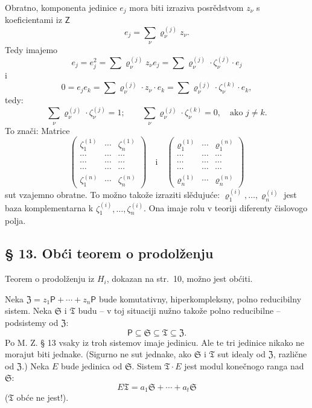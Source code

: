 \documentclass[11pt]{article}
\begin{document}
Obratno, komponenta jedinice \(e_j\) mora biti izraziva posrědstvom \(z_\nu\) s koeficientami iz \(\mathsf Z\)
\[
e_j=\sum_\nu \varrho_\nu^{(j)}z_\nu .
\]
Tedy imajemo
\[
e_j=e_j^2=\sum \varrho_\nu^{(j)}z_\nu e_j
=\sum \varrho_\nu^{(j)}\cdot\zeta_\nu^{(j)}\cdot e_j
\]
i
\[
0=e_je_k=\sum \varrho_\nu^{(j)}\cdot z_\nu\cdot e_k
=\sum \varrho_\nu^{(j)}\cdot\zeta_\nu^{(k)}\cdot e_k,
\]
tedy:
\[
\sum_\nu \varrho_\nu^{(j)}\cdot\zeta_\nu^{(j)}=1;
\qquad
\sum_\nu \varrho_\nu^{(j)}\cdot\zeta_\nu^{(k)}=0,\quad
\text{ako } j\ne k.
\]
To znači: Matrice
\[
\begin{pmatrix}
\zeta_1^{(1)} & \cdots & \zeta_n^{(1)}\\
\cdots & \cdots & \cdots\\
\cdots & \cdots & \cdots\\
\cdots & \cdots & \cdots\\
\zeta_1^{(n)} & \cdots & \zeta_n^{(n)}
\end{pmatrix}
\quad\text{i}\quad
\begin{pmatrix}
\varrho_1^{(1)} & \cdots & \varrho_1^{(n)}\\
\cdots & \cdots & \cdots\\
\cdots & \cdots & \cdots\\
\cdots & \cdots & \cdots\\
\varrho_n^{(1)} & \cdots & \varrho_n^{(n)}
\end{pmatrix}
\]
sut vzajemno obratne. To možno takože izraziti slědujuće: \(\varrho_1^{(i)},\ldots,\varrho_n^{(i)}\) jest baza komplementarna k \(\zeta_1^{(i)},\ldots,\zeta_n^{(i)}\). Ona imaje rolu v teoriji diferenty čislovogo polja.

\subsection*{§ 13. Obći teorem o prodolženju}\label{der-allgemeine-fortsetzungssatz}

Teorem o prodolženju iz \(H_i\), dokazan na str.~10, možno jest obćiti.

Neka \(\mathfrak Z=z_1\mathsf P+\cdots+z_n\mathsf P\) bude komutativny, hiperkompleksny, polno reducibilny sistem. Neka \(\mathfrak S\) i \(\mathfrak T\) budu -- v toj situaciji nužno takože polno reducibilne -- podsistemy od \(\mathfrak Z\):
\[
\mathsf P\subseteq\mathfrak S\subseteq\mathfrak T\subseteq\mathfrak Z .
\]
Po M. Z. § 13 vsaky iz troh sistemov imaje jedinicu. Ale te tri jedinice nikako ne morajut biti jednake. (Sigurno ne sut jednake, ako \(\mathfrak S\) i \(\mathfrak T\) sut idealy od \(\mathfrak Z\), različne od \(\mathfrak Z\).) Neka \(E\) bude jedinica od \(\mathfrak S\). Sistem \(\mathfrak T\cdot E\) jest modul konečnogo ranga nad \(\mathfrak S\):
\[
E\mathfrak T=a_1\mathfrak S+\cdots+a_t\mathfrak S
\]
(\(\mathfrak T\) obće ne jest!).
\end{document}
